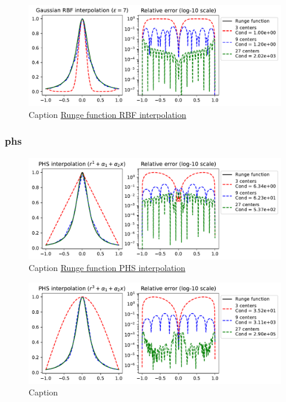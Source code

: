 \documentclass[12pt]{report} %
\begin{document}
\begin{figure}[ht]
  \centering
  \includegraphics[width=\textwidth]{imagenes/rbf_interpolation/rbf_runge_7.pdf}
  \caption{Caption \href{https://github.com/heqro/tfm-experiments/blob/main/introductory_notebooks/rbf_interpolation/runge_phs.ipynb}{Runge function RBF interpolation}}
  \label{fig:rbf-runge-phenomenon-eps-7}
\end{figure}

\subsubsection{phs}

\begin{figure}[ht]
  \centering
  \includegraphics[width=\textwidth]{imagenes/phs_interpolation/runge_phs_r1_deg1.pdf}
  \caption{Caption \href{https://github.com/heqro/tfm-experiments/blob/main/introductory_notebooks/rbf_interpolation/runge_phs.ipynb}{Runge function PHS interpolation}}
  \label{fig:phs-runge-phenomenon-deg-1}
\end{figure}

\begin{figure}[ht]
  \centering
  \includegraphics[width=\textwidth]{imagenes/phs_interpolation/runge_phs_r3_deg1.pdf}
  \caption{Caption}
  \label{fig:phs-runge-phenomenon-deg-3}
\end{figure}
\end{document}

